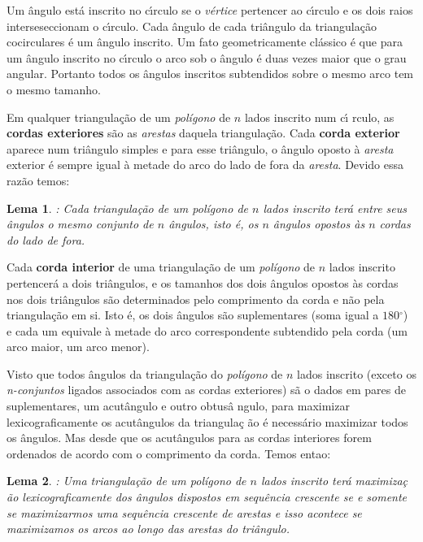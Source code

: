 \documentclass[12pt,a4paper]{book}
\newtheorem{Lem}{Lema}
\begin{document}
Um \^{a}ngulo est\'{a} inscrito no c\'{\i}rculo se o \textit{v\'{e}rtice}
pertencer ao c\'{\i}rculo e os dois raios interseseccionam o c\'{\i}rculo.
Cada \^{a}ngulo de cada tri\^{a}ngulo da triangula\c{c}\~{a}o cocirculares 
\'{e} um \^{a}ngulo inscrito. Um fato geometricamente cl\'{a}ssico \'{e} que
para um \^{a}ngulo inscrito no c\'{\i}rculo o arco sob o \^{a}ngulo \'{e}
duas vezes maior que o grau angular. Portanto todos os \^{a}ngulos inscritos
subtendidos sobre o mesmo arco tem o mesmo tamanho.

Em qualquer tri{a}ngula\c{c}\~{a}o de um \textit{pol\'igono} de $n$ lados inscrito num c\'{\i}%
rculo, as \textbf{cordas exteriores} s\~{a}o as \textit{arestas} daquela
triangula\c{c}\~{a}o. Cada \textbf{corda exterior} aparece num tri\^{a}ngulo
simples e para esse tri\^{a}ngulo, o \^{a}ngulo oposto \`{a} \textit{aresta}
exterior \'{e} sempre igual \`{a} metade do arco do lado de fora da \textit{%
aresta}. Devido essa raz\~{a}o temos:

\begin{Lem}
: Cada triangula\c{c}\~{a}o de um \textit{pol\'igono} de $n$ lados inscrito ter\'{a} entre seus \^{a}ngulos o mesmo conjunto de $n$ \^{a}ngulos, isto \'{e}, os $n$ \^{a}ngulos opostos \`{a}s $n$ cordas do lado de fora.
\end{Lem}

Cada \textbf{corda interior} de uma tri{a}ngula\c{c}\~{a}o de um \textit{pol\'igono}
de $n$ lados inscrito pertencer\'{a} a dois tri\^{a}ngulos, e os tamanhos dos dois \^{a}ngulos opostos \`{a}s cordas nos dois tri\^{a}ngulos s\~{a}o determinados pelo comprimento da corda e n\~{a}o pela triangula\c{c}\~{a}o em si. Isto \'{e}, os dois \^{a}ngulos s\~{a}o suplementares (soma igual a $180%
{{}^\circ}%
$) e cada um equivale \`{a} metade do arco correspondente subtendido pela
corda (um arco maior, um arco menor).

Visto que todos \^{a}ngulos da triangula\c{c}\~{a}o do \textit{pol\'igono} de $n$ lados inscrito
(exceto os \textit{n-conjuntos} ligados associados com as cordas exteriores) s\~{a}%
o dados em pares de suplementares, um acut\^{a}ngulo e outro obtus\^{a}%
ngulo, para maximizar lexicograficamente os acut\^{a}ngulos da triangula\c{c}%
\~{a}o \'{e} necess\'{a}rio maximizar todos os \^{a}ngulos. Mas desde que os
acut\^{a}ngulos para as cordas interiores forem ordenados de acordo com o
comprimento da corda. Temos entao:

\begin{Lem}
: Uma triangula\c{c}\~{a}o de um \textit{pol\'igono} de $n$ lados inscrito ter\'{a} maximiza\c{c}%
\~{a}o lexicograficamente dos \^{a}ngulos dispostos em sequ\^{e}ncia
crescente se e somente se maximizarmos uma sequ\^{e}ncia crescente de \textit{%
arestas} e isso acontece se maximizamos os arcos ao longo das \emph{arestas}
do tri\^{a}ngulo.
\end{Lem}
\end{document}
